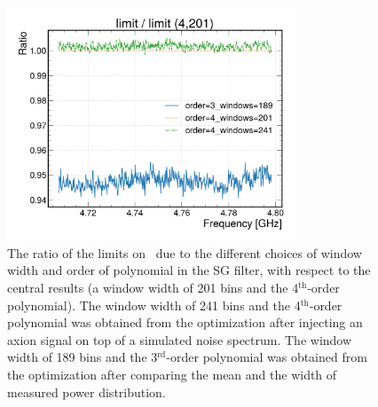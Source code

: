 \begin{figure} [htbp]
  \centering
  \includegraphics[width=8.6cm]{figures/sys_compareSG_4_201.png}
  \caption{The ratio of the limits on \gagg\ due to the different choices 
 of window width and order of polynomial in the SG filter, with respect to 
 the central results (a window width of 201 bins and the 4$^\text{th}$-order 
 polynomial). The window width of 241 bins and the 4$^\text{th}$-order 
 polynomial was obtained from the optimization after injecting an axion 
signal on top of a simulated noise spectrum. The window width of 189 bins and 
the 3$^\text{rd}$-order polynomial was obtained from the optimization 
 after comparing the mean and the width of measured power distribution.}
  \label{fig:syssgfilter}
\end{figure}
 

